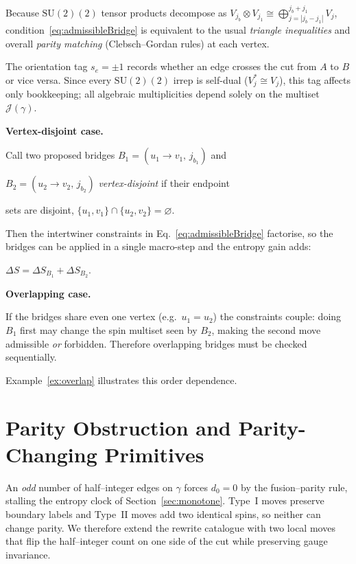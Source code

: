 \documentclass[11pt]{article}
\newcommand{\SU}{\mathrm{SU}(2)}
\newcommand{\Cut}{\gamma}
\newcommand{\JS}{\mathcal{J}} %
\begin{document}
\noindent
Because $\SU(2)$ tensor products decompose as
\(V_{j_b}\otimes V_{j_1}\cong
  \bigoplus_{j=|j_b-j_1|}^{j_b+j_1}V_{j}\),
condition~\eqref{eq:admissibleBridge} is equivalent to the usual
\emph{triangle inequalities} and overall \emph{parity matching}
(Clebsch–Gordan rules) at each vertex.

\begin{remark}\label{rem:orientationBook}
The orientation tag $s_e=\pm1$ records whether an edge crosses the cut
from $A$ to $B$ or vice versa.  Since every $\SU(2)$ irrep is self-dual
($V_j^{*}\!\cong\!V_j$), this tag affects only bookkeeping; all algebraic
multiplicities depend solely on the multiset~$\JS(\Cut)$.
\end{remark}


\begin{remark}\label{rem:simul}

\textbf{Vertex-disjoint case.}

Call two proposed bridges $B_1=(u_1\!\to\! v_1,\,j_{b_1})$ and

$B_2=(u_2\!\to\! v_2,\,j_{b_2})$ \emph{vertex-disjoint} if their endpoint

sets are disjoint, $\{u_1,v_1\}\cap\{u_2,v_2\}=\varnothing$.

Then the intertwiner constraints in Eq.~\eqref{eq:admissibleBridge} factorise,
so the bridges can be applied in a single macro-step and the entropy gain
adds:

$\Delta S=\Delta S_{B_1}+\Delta S_{B_2}$.

\textbf{Overlapping case.}

If the bridges share even one vertex (e.g.\ $u_1=u_2$) the constraints
couple: doing $B_1$ first may change the spin multiset seen by $B_2$,
making the second move admissible \emph{or} forbidden.
Therefore overlapping bridges must be checked sequentially.

Example~\ref{ex:overlap} illustrates this order dependence.

\end{remark}


\section{Parity Obstruction and Parity-Changing Primitives}\label{sec:parity}

An \emph{odd} number of half--integer edges on $\Cut$ forces $d_0=0$ by the
fusion–parity rule, stalling the entropy clock of
Section~\ref{sec:monotone}.  Type~I moves preserve boundary labels and
Type~II moves add two identical spins, so neither can change parity.  We
therefore extend the rewrite catalogue with two local moves that flip the
half–integer count on one side of the cut while preserving gauge
invariance.
\end{document}
